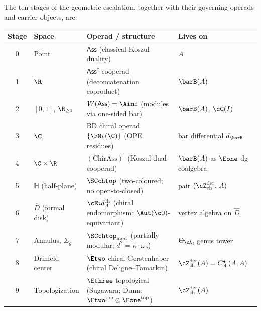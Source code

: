 \begin{proposition}
\label{prop:en-taxonomy}
The ten stages of the geometric escalation, together with their
governing operads and carrier objects, are:

\smallskip
\begin{center}
\renewcommand{\arraystretch}{1.25}
\begin{tabular}{@{}clp{5.6cm}l@{}}
\toprule
\textbf{Stage} & \textbf{Space} & \textbf{Operad / structure}
 & \textbf{Lives on} \\
\midrule
0 & Point
 & $\mathsf{Ass}$ \textup{(}classical Koszul duality\textup{)}
 & $A$ \\
1 & $\R$
 & $\mathsf{Ass}^c$ cooperad \textup{(}deconcatenation coproduct\textup{)}
 & $\barB(A)$ \\
2 & $[0,1]$, $\R_{\ge 0}$
 & $W(\mathsf{Ass}) = \Ainf$ \textup{(}modules via one-sided bar\textup{)}
 & $\barB(A)$, $\cC(I)$ \\
3 & $\C$
 & BD chiral operad $\{\FM_k(\C)\}$ \textup{(}OPE residues\textup{)}
 & bar differential $d_{\barB}$ \\
4 & $\C \times \R$
 & $(\mathrm{ChirAss})^!$ \textup{(}Koszul dual cooperad\textup{)}
 & $\barB(A)$ as $\Eone$ dg coalgebra \\
5 & $\mathbb{H}$ \textup{(}half-plane\textup{)}
 & $\SCchtop$ \textup{(}two-coloured; no open-to-closed\textup{)}
 & pair $(\cZ^{\mathrm{der}}_{\mathrm{ch}},\, A)$ \\
6 & $\widehat{D}$ \textup{(}formal disk\textup{)}
 & $\cE\!nd^{\mathrm{ch}}_A$ \textup{(}chiral endomorphism;
 $\Aut(\cO)$-equivariant\textup{)}
 & vertex algebra on $\widehat{D}$ \\
7 & Annulus, $\Sigma_g$
 & $\SCchtop_{\mathrm{mod}}$ \textup{(}partially modular;
 $d^2 = \kappa \cdot \omega_g$\textup{)}
 & $\Theta_\cA$, genus tower \\
8 & Drinfeld center
 & $\Etwo$-chiral Gerstenhaber \textup{(}chiral
 Deligne--Tamarkin\textup{)}
 & $\cZ^{\mathrm{der}}_{\mathrm{ch}}(A) =
 C^\bullet_{\mathrm{ch}}(A,A)$ \\
9 & Topologization
 & $\Ethree$-topological \textup{(}Sugawara; Dunn:
 $\Etwo^{\mathrm{top}} \otimes \Eone^{\mathrm{top}}$\textup{)}
 & $\cZ^{\mathrm{der}}_{\mathrm{ch}}(A)$ \\
\bottomrule
\end{tabular}
\end{center}


\end{proposition}
